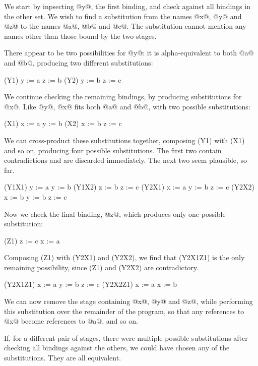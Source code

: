 We start by inpsecting @y@, the first binding, and check against all bindings in the other set.
We wish to find a substitution from the names @x@, @y@ and @z@ to the names @a@, @b@ and @c@.
The substitution cannot mention any names other than those bound by the two stages.

There appear to be two possibilities for @y@: it is alpha-equivalent to both @a@ and @b@, producing two different substitutions:
\begin{code}
(Y1)
y := a
z := b
(Y2)
y := b
z := c
\end{code}

We continue checking the remaining bindings, by producing substitutions for @x@.
Like @y@, @x@ fits both @a@ and @b@, with two possible substitutions:
\begin{code}
(X1)
x := a
y := b
(X2)
x := b
z := c
\end{code}

We can cross-product these substitutions together, composing (Y1) with (X1) and so on, producing four possible substitutions.
The first two contain contradictions and are discarded immediately.
The next two seem plausible, so far.
\begin{code}
(Y1X1)
y := a
y := b
(Y1X2)
z := b
z := c
(Y2X1)
x := a
y := b
z := c
(Y2X2)
x := b
y := b
z := c
\end{code}

Now we check the final binding, @z@, which produces only one possible substitution:
\begin{code}
(Z1)
z := c
x := a
\end{code}

Composing (Z1) with (Y2X1) and (Y2X2), we find that (Y2X1Z1) is the only remaining possibility, since (Z1) and (Y2X2) are contradictory.
\begin{code}
(Y2X1Z1)
x := a
y := b
z := c
(Y2X2Z1)
x := a
x := b
\end{code}

We can now remove the stage containing @x@, @y@ and @z@, while performing this substitution over the remainder of the program, so that any references to @x@ become references to @a@, and so on.

If, for a different pair of stages, there were multiple possible substitutions after checking all bindings against the others, we could have chosen any of the substitutions.
They are all equivalent.



